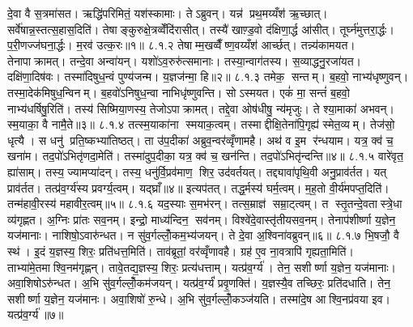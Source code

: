 दे॒वा वै स॒त्रमा॑सत। ऋद्धि॑परिमितं॒ यश॑स्कामाः। तेऽब्रुवन्। यन्न॑ प्रथ॒मय्यँश॑ ऋ॒च्छात्। सर्वे॑षान्न॒स्तत्स॒हास॒दिति॑। तेषाङ्कुरुक्षे॒त्रव्वेँदि॑रासीत्। तस्यै॑ खाण़्ड॒वो द॑क्षिणा॒र्द्ध आ॑सीत्। तूर्घ्न॑मुत्तरा॒र्द्धः। प॒री॒णज्ज॑घना॒र्द्धः। म॒रव॑ उत्क॒रः॥१॥
८.१.२
तेषाम्म॒खव्वैँष्ण॒वय्यँश॑ आर्च्छत्। तन्न्य॑कामयत। तेनापाक्रामत्। तन्दे॒वा अन्वा॑यन्। यशो॑ऽव॒रुरु॑त्समानाः। तस्या॒न्वाग॑तस्य। स॒व्याद्धनु॒रजा॑यत। दक्षि॑णा॒दिष॑वः। तस्मा॑दिषुध॒न्वं पुण्य॑जन्म। य॒ज्ञज॑न्मा॒ हि॥२॥
८.१.३
तमेक॒ सन्तम्। ब॒हवो॒ नाभ्य॑धृष्णुवन्। तस्मा॒देक॑मिषुध॒न्विनम्। ब॒हवो॑ऽनिषुध॒न्वा नाभिधृ॑ष्णुवन्ति। सोऽस्मयत। एकं॑ मा॒ सन्तं॑ ब॒हवो॒ नाभ्य॑धर्\mbox{}षिषु॒रिति॑। तस्य॑ सिष्मिया॒णस्य॒ तेजोऽपाक्रामत्। तद्दे॒वा ओष॑धीषु॒ न्य॑मृजुः। ते श्या॒माका॑ अभवन्। स्म॒याका॒ वै नामै॒ते॥३॥
८.१.४
तत्स्म॒याका॑ना स्मयाक॒त्वम्। तस्माद्दीक्षि॒तेना॑पि॒गृह्य॑ स्मेत॒व्यम्। तेज॑सो॒ धृत्यै। स धनु॑ प्रति॒ष्कभ्या॑तिष्ठत्। ता उ॑प॒दीका॑ अब्रुव॒न्वर॑व्वृँणामहै। अथ॑ व इ॒म र॑न्धयाम। यत्र॒ क्व॑ च॒ खना॑म। तद॒पो॑ऽभितृ॑णदा॒मेति॑। तस्मा॑दुप॒दीका॒ यत्र॒ क्व॑ च॒ खन॑न्ति। तद॒पो॑ऽभितृ॑न्दन्ति॥४॥
८.१.५
वारे॑वृत॒ ह्या॑साम्। तस्य॒ ज्यामप्या॑दन्। तस्य॒ धनु॑र्वि॒प्रव॑माण॒ शिर॒ उद॑वर्तयत्। तद्द्यावा॑पृथि॒वी अनु॒प्राव॑र्तत। यत् प्राव॑र्तत। तत्प्र॑व॒र्ग्य॑स्य प्रवर्ग्य॒त्वम्। यद्घ्राँ॥४॥ इत्यप॑तत्। तद्ध॒र्मस्य॑ घर्म॒त्वम्। म॒ह॒तो वी॒र्य॑मपप्त॒दिति॑। तन्म॑हावी॒रस्य॑ महावीर॒त्वम्॥५॥
८.१.६
यद॒स्याः स॒मभ॑रन्। तत्स॒म्राज्ञ॑ सम्रा॒ट्त्वम्। त स्तृ॒तन्दे॒वतास्त्रे॒धा व्य॑गृह्णत। अ॒ग्निः प्रा॑तः सव॒नम्। इन्द्रो॒ माध्य॑न्दिन॒ सव॑नम्। विश्वे॑दे॒वास्तृ॑तीयसव॒नम्। तेनाप॑शीर्ष्णा य॒ज्ञेन॒ यज॑मानाः। नाशिषो॒ऽवारु॑न्धत। न सु॑व॒र्गल्लोँ॒कम॒भ्य॑जयन्। ते दे॒वा अ॒श्विना॑वब्रुवन्॥६॥
८.१.७
भि॒षजौ॒ वै स्थ॑। इ॒दं य॒ज्ञस्य॒ शिरः॒ प्रति॑धत्त॒मिति॑। ताव॑ब्रूतां॒ वर॑व्वृँणावहै। ग्रह॑ ए॒व ना॒वत्रापि॑ गृह्यता॒मिति॑। ताभ्या॑मे॒तमाश्वि॒नम॑गृह्णन्। तावे॒तद्य॒ज्ञस्य॒ शिरः॒ प्रत्य॑धत्ताम्। यत्प्र॑व॒र्ग्य॑। तेन॒ सशीर्ष्णा य॒ज्ञेन॒ यज॑मानाः। अवा॒शिषोऽरु॑न्धत। अ॒भि सु॑व॒र्गल्लोँ॒कम॑जयन्। यत्प्र॑व॒र्ग्यं॑ प्रवृ॒णक्ति॑। य॒ज्ञस्यै॒व तच्छिरः॒ प्रति॑दधाति। तेन॒ सशीर्ष्णा य॒ज्ञेन॒ यज॑मानः। अवा॒शिषो॑ रु॒न्धे। अ॒भि सु॑व॒र्गल्लोँ॒कञ्ज॑यति। तस्मा॑दे॒ष आश्वि॒नप्र॑वया इव। यत्प्र॑व॒र्ग्य॑॥७॥
\anuvakamend


